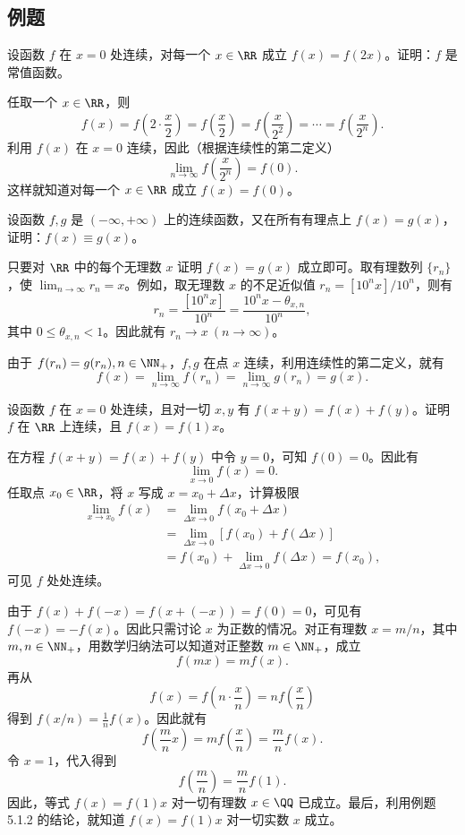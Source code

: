 \subsection{例题}

\begin{xexample}[5.1.1]
设函数 $f$ 在 $x=0$ 处连续，对每一个 $x\in\RR$ 成立 $f(x)=f(2x)$。证明：$f$ 是常值函数。
\end{xexample}
\begin{xproof}
任取一个 $x\in\RR$，则
\[
  f(x)=f\left(2\cdot\frac{x}{2}\right)=f\left(\frac{x}{2}\right)=f\left(\frac{x}{2^2}\right)=\cdots=f\left(\frac{x}{2^n}\right).
\]
利用 $f(x)$ 在 $x=0$ 连续，因此（根据连续性的第二定义）
\[
  \lim_{n\to\infty}f\left(\frac{x}{2^n}\right)=f(0).
\]
这样就知道对每一个 $x\in\RR$ 成立 $f(x)=f(0)$。
\end{xproof}

\begin{xexample}[5.1.2]
设函数 $f,g$ 是 $(-\infty,+\infty)$ 上的连续函数，又在所有有理点上 $f(x)=g(x)$，证明：$f(x)\equiv g(x)$。
\end{xexample}
\begin{xproof}
只要对 $\RR$ 中的每个无理数 $x$ 证明 $f(x)=g(x)$ 成立即可。取有理数列 $\{r_n\}$，使 $\lim_{n\to\infty}r_n=x$。例如，取无理数 $x$ 的不足近似值 $r_n=[10^n x]/10^n$，则有
\[
  r_n=\frac{[10^n x]}{10^n}=\frac{10^n x-\theta_{x,n}}{10^n},
\]
其中 $0\le \theta_{x,n}<1$。因此就有 $r_n\to x\ (n\to\infty)$。

由于 $f(r_n)=g(r_n),n\in\NN_+$，$f,g$ 在点 $x$ 连续，利用连续性的第二定义，就有
\[
  f(x)=\lim_{n\to\infty}f(r_n)=\lim_{n\to\infty}g(r_n)=g(x).
\]
\end{xproof}

\begin{xexample}[5.1.3（一个函数方程的连续解）]
设函数 $f$ 在 $x=0$ 处连续，且对一切 $x,y$ 有 $f(x+y)=f(x)+f(y)$。证明 $f$ 在 $\RR$ 上连续，且 $f(x)=f(1)x$。
\end{xexample}
\begin{xproof}
在方程 $f(x+y)=f(x)+f(y)$ 中令 $y=0$，可知 $f(0)=0$。因此有
\[
  \lim_{x\to0}f(x)=0.
\]
任取点 $x_0\in\RR$，将 $x$ 写成 $x=x_0+\Delta x$，计算极限
\[
\begin{aligned}
  \lim_{x\to x_0}f(x)
  &=\lim_{\Delta x\to0}f(x_0+\Delta x)\\
  &=\lim_{\Delta x\to0}[f(x_0)+f(\Delta x)]\\
  &=f(x_0)+\lim_{\Delta x\to0}f(\Delta x)=f(x_0),
\end{aligned}
\]
可见 $f$ 处处连续。

由于 $f(x)+f(-x)=f(x+(-x))=f(0)=0$，可见有 $f(-x)=-f(x)$。因此只需讨论 $x$ 为正数的情况。对正有理数 $x=m/n$，其中 $m,n\in\NN_+$，用数学归纳法可以知道对正整数 $m\in\NN_+$，成立
\[
  f(mx)=mf(x).
\]
再从
\[
  f(x)=f\left(n\cdot\frac{x}{n}\right)=nf\left(\frac{x}{n}\right)
\]
得到 $f(x/n)=\frac1n f(x)$。因此就有
\[
  f\left(\frac{m}{n}x\right)=mf\left(\frac{x}{n}\right)=\frac{m}{n}f(x).
\]
令 $x=1$，代入得到
\[
  f\left(\frac{m}{n}\right)=\frac{m}{n}f(1).
\]
因此，等式 $f(x)=f(1)x$ 对一切有理数 $x\in\QQ$ 已成立。最后，利用例题 5.1.2 的结论，就知道 $f(x)=f(1)x$ 对一切实数 $x$ 成立。
\end{xproof}

